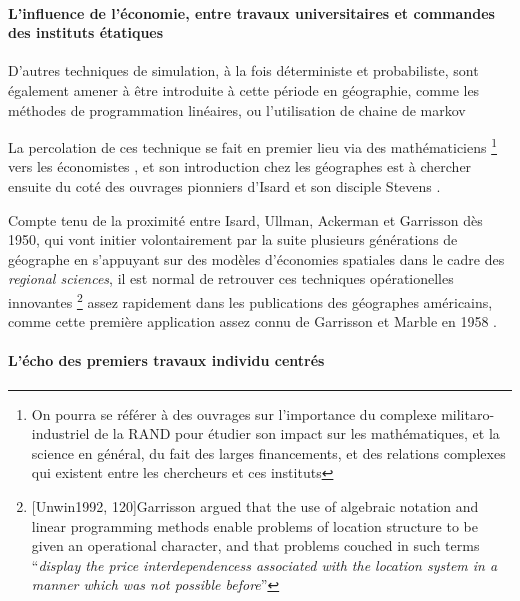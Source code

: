 \paragraph{L'influence de l'économie, entre travaux universitaires et commandes des instituts étatiques}

D'autres techniques de simulation, à la fois déterministe et probabiliste, sont également amener à être introduite à cette période en géographie, comme les méthodes de programmation linéaires, ou l'utilisation de chaine de markov \autocite{Marble1964} \autocite{Clark1965} 

La percolation de ces technique se fait en premier lieu via des mathématiciens \footnote{On pourra se référer à des ouvrages sur l'importance du complexe militaro-industriel de la RAND pour étudier son impact sur les mathématiques, et la science en général, du fait des larges financements, et des relations complexes qui existent entre les chercheurs et ces instituts} vers les économistes \autocite{Samuelson1952}, et son introduction chez les géographes est à chercher ensuite du coté des ouvrages pionniers d'Isard \autocite{Isard1956} \autocite{Isard1958} et son disciple Stevens \autocite{Stevens1958}.

Compte tenu de la proximité entre Isard, Ullman, Ackerman et Garrisson \autocite{Barnes2004} dès 1950, qui vont initier volontairement \autocite[120]{Unwin1992} par la suite plusieurs générations de géographe en s'appuyant sur des modèles d'économies spatiales dans le cadre des \textit{regional sciences}, il est normal de retrouver ces techniques opérationelles innovantes \footnote{ [Unwin1992, 120]{Garrisson argued that the use of algebraic notation and linear programming methods enable problems of location structure to be given an operational character, and that problems couched in such terms \enquote{\textit{display the price interdependencess associated with the location system in a manner which was not possible before}}}} assez rapidement dans les publications des géographes américains, comme cette première application assez connu de Garrisson et Marble en 1958 \autocite{Garrison1958}.


\paragraph{L'écho des premiers travaux individu centrés}


